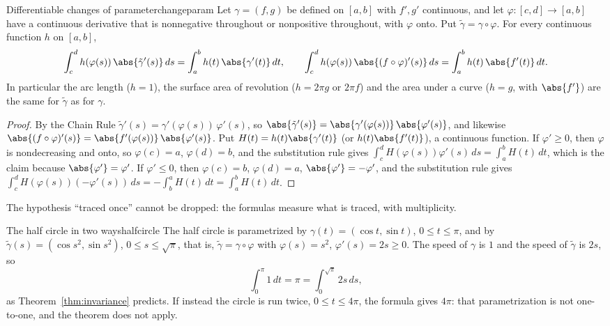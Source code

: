 \documentclass[11pt]{article}
\begin{document}
\begin{thm}{Differentiable changes of parameter}{changeparam}
Let $\gamma=(f,g)$ be defined on $[a,b]$ with $f',g'$ continuous, and let $\varphi:[c,d]\to[a,b]$ have a continuous derivative that is nonnegative throughout or nonpositive throughout, with $\varphi$ onto. Put $\tilde\gamma=\gamma\circ\varphi$. For every continuous function $h$ on $[a,b]$,
\[
\int_c^dh(\varphi(s))\,\abs{\tilde\gamma'(s)}\,ds=\int_a^bh(t)\,\abs{\gamma'(t)}\,dt,\qquad \int_c^dh(\varphi(s))\,\abs{(f\circ\varphi)'(s)}\,ds=\int_a^bh(t)\,\abs{f'(t)}\,dt.
\]
In particular the arc length ($h=1$), the surface area of revolution ($h=2\pi g$ or $2\pi f$) and the area under a curve ($h=g$, with $\abs{f'}$) are the same for $\tilde\gamma$ as for $\gamma$.
\end{thm}
\begin{proof}
By the Chain Rule $\tilde\gamma'(s)=\gamma'(\varphi(s))\,\varphi'(s)$, so $\abs{\tilde\gamma'(s)}=\abs{\gamma'(\varphi(s))}\,\abs{\varphi'(s)}$, and likewise $\abs{(f\circ\varphi)'(s)}=\abs{f'(\varphi(s))}\,\abs{\varphi'(s)}$. Put $H(t)=h(t)\abs{\gamma'(t)}$ (or $h(t)\abs{f'(t)}$), a continuous function. If $\varphi'\ge0$, then $\varphi$ is nondecreasing and onto, so $\varphi(c)=a$, $\varphi(d)=b$, and the substitution rule gives $\int_c^dH(\varphi(s))\varphi'(s)\,ds=\int_a^bH(t)\,dt$, which is the claim because $\abs{\varphi'}=\varphi'$. If $\varphi'\le0$, then $\varphi(c)=b$, $\varphi(d)=a$, $\abs{\varphi'}=-\varphi'$, and the substitution rule gives $\int_c^dH(\varphi(s))(-\varphi'(s))\,ds=-\int_b^aH(t)\,dt=\int_a^bH(t)\,dt$.
\end{proof}

The hypothesis ``traced once'' cannot be dropped: the formulas measure what is traced, with multiplicity.

\begin{exmp}{The half circle in two ways}{halfcircle}
The half circle is parametrized by $\gamma(t)=(\cos t,\sin t)$, $0\le t\le\pi$, and by $\tilde\gamma(s)=(\cos s^2,\sin s^2)$, $0\le s\le\sqrt\pi$, that is, $\tilde\gamma=\gamma\circ\varphi$ with $\varphi(s)=s^2$, $\varphi'(s)=2s\ge0$. The speed of $\gamma$ is $1$ and the speed of $\tilde\gamma$ is $2s$, so
\[
\int_0^\pi1\,dt=\pi=\int_0^{\sqrt\pi}2s\,ds,
\]
as Theorem~\ref{thm:invariance} predicts. If instead the circle is run twice, $0\le t\le4\pi$, the formula gives $4\pi$: that parametrization is not one-to-one, and the theorem does not apply.
\end{exmp}
\end{document}
